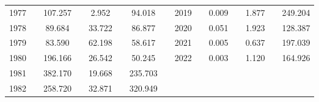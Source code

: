 \begin{landscape}
\begin{table}[]
\begin{tabular}{clccccccclccccc}
1977 &  & 107.257 &  & 2.952 &  & 94.018 &  & 2019 &  & 0.009 &  & 1.877 &  & 249.204 \\
1978 &  & 89.684 &  & 33.722 &  & 86.877 &  & 2020 &  & 0.051 &  & 1.923 &  & 128.387 \\
1979 &  & 83.590 &  & 62.198 &  & 58.617 &  & 2021 &  & 0.005 &  & 0.637 &  & 197.039 \\
1980 &  & 196.166 &  & 26.542 &  & 50.245 &  & 2022 &  & 0.003 &  & 1.120 &  & 164.926 \\
1981 &  & 382.170 &  & 19.668 &  & 235.703 &  &  &  & \multicolumn{1}{l}{} & \multicolumn{1}{l}{} & \multicolumn{1}{l}{} & \multicolumn{1}{l}{} & \multicolumn{1}{l}{} \\
1982 &  & 258.720 &  & 32.871 &  & 320.949 &  &  &  & \multicolumn{1}{l}{} & \multicolumn{1}{l}{} & \multicolumn{1}{l}{} & \multicolumn{1}{l}{} & \multicolumn{1}{l}{} \\ \hline
\end{tabular}
\end{table}
\endgroup{}
\end{landscape}
\endgroup{}
